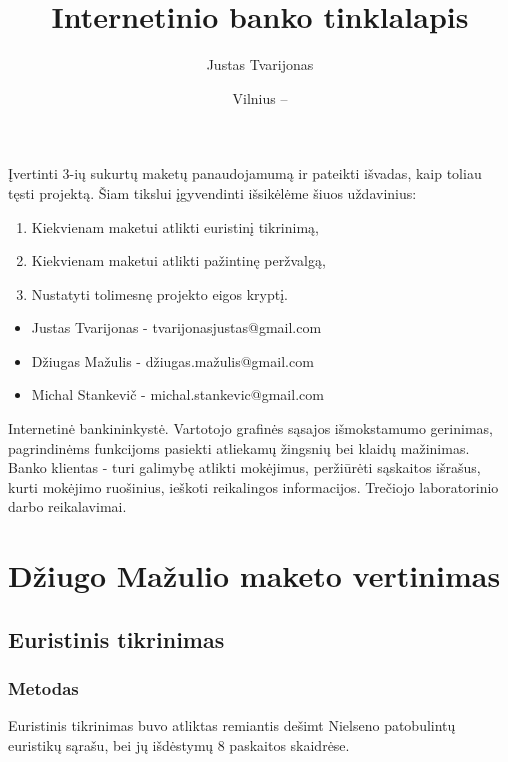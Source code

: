 \documentclass[oneside]{VUMIFPSkursinis}
\title{Internetinio banko tinklalapis}
\author{Justas Tvarijonas}
\date{Vilnius – \the\year}
\begin{document}
\maketitle
{}
Įvertinti 3-ių sukurtų maketų panaudojamumą ir pateikti išvadas, kaip toliau tęsti projektą. Šiam tikslui įgyvendinti išsikėlėme šiuos uždavinius:
\begin{enumerate}
	\item Kiekvienam maketui atlikti euristinį tikrinimą,
	\item Kiekvienam maketui atlikti pažintinę peržvalgą,
	\item Nustatyti tolimesnę projekto eigos kryptį.
\end{enumerate}
\begin{itemize}
	\item Justas Tvarijonas - tvarijonasjustas@gmail.com
	\item Džiugas Mažulis - džiugas.mažulis@gmail.com
	\item Michal Stankevič - michal.stankevic@gmail.com 
\end{itemize}
\tableofcontents
{}
Internetinė bankininkystė.
Vartotojo grafinės sąsajos išmokstamumo gerinimas, pagrindinėms funkcijoms pasiekti atliekamų žingsnių bei klaidų mažinimas.
Banko klientas - turi galimybę atlikti mokėjimus, peržiūrėti sąskaitos išrašus, kurti mokėjimo ruošinius, ieškoti reikalingos informacijos.
Trečiojo laboratorinio darbo reikalavimai.
\section{Džiugo Mažulio maketo vertinimas}
\subsection{Euristinis tikrinimas}
\subsubsection{Metodas}
Euristinis tikrinimas buvo atliktas remiantis dešimt Nielseno patobulintų euristikų sąrašu, bei jų išdėstymų 8 paskaitos skaidrėse.
\end{document}
